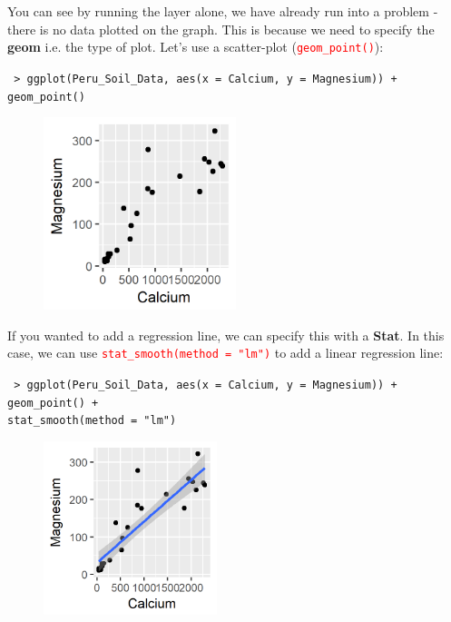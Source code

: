 \documentclass[a4paper,12pt]{article}
\newcommand\code[1]{\textcolor{red}{\texttt{#1}}}
\begin{document}
You can see by running the layer alone, we have already run into a problem - there is no data plotted on the graph. This is because we need to specify the \textbf{geom} i.e. the type of plot. Let's use a scatter-plot (\code{geom\_point()}):

\begin{shaded}
\texttt{ > ggplot(Peru\_Soil\_Data, aes(x = Calcium, y = Magnesium)) + \\
\hspace*{1cm} geom\_point()}
\end{shaded}

\begin{figure}[h]
	\centering
	\includegraphics[width=0.5\textwidth]{figs/fig1.png}
	\label{fig:fig1}
\end{figure}

If you wanted to add a regression line, we can specify this with a \textbf{Stat}. In this case, we can use \code{stat\_smooth(method = "lm")} to add a linear regression line:

\begin{shaded}
\texttt{ > ggplot(Peru\_Soil\_Data, aes(x = Calcium, y = Magnesium)) + \\
\hspace*{1cm} geom\_point() + \\
\hspace*{1cm} stat\_smooth(method = "lm")}
\end{shaded}

\begin{figure}[h]
	\centering
	\includegraphics[width=0.45\textwidth]{figs/fig2.png}
	\label{fig:fig2}
\end{figure}
\end{document}
